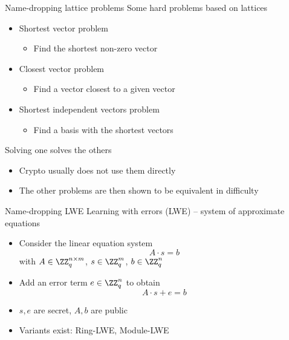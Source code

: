 \begin{frame}{Name-dropping lattice problems}
  Some hard problems based on lattices
  \begin{itemize}[<+(1)->]
    \item Shortest vector problem
    \begin{itemize}
      \item Find the shortest non-zero vector
    \end{itemize}
    \item Closest vector problem
    \begin{itemize}
      \item Find a vector closest to a given vector
    \end{itemize}
    \item Shortest independent vectors problem
    \begin{itemize}
      \item Find a basis with the shortest vectors
    \end{itemize}
  \end{itemize}

  \pause
  Solving one solves the others
  \begin{itemize}[<+(1)->]
    \item Crypto usually does not use them directly
    \item The other problems are then shown to be equivalent in difficulty
  \end{itemize}
\end{frame}

\begin{frame}{Name-dropping LWE}
  Learning with errors (LWE) -- system of approximate equations
  \begin{itemize}[<+(1)->]
    \item Consider the linear equation system
    \[
      A \cdot s = b
    \]
    with $A \in \ZZ_q^{n \times m}$, $s\in\ZZ_q^m$, $b\in\ZZ_q^n$
    \item Add an error term $e\in\ZZ_q^n$ to obtain
    \[
      A \cdot s + e = b
    \]
    \item $s, e$ are secret, $A, b$ are public
    \item Variants exist: Ring-LWE, Module-LWE
  \end{itemize}
\end{frame}


